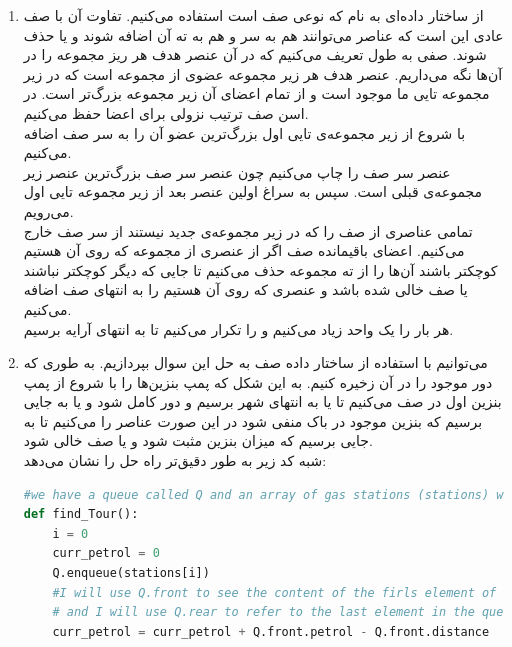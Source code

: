 \documentclass{article}
\begin{document}
\begin{enumerate}
\begin{enumerate}
\begin{latin}
\begin{flushright}
\begin{lstlisting}[language=C++]
    }
	\end{lstlisting}
	\end{flushright}								
	\end{latin}
	\end{enumerate}
	\item از ساختار داده‌ای به نام  که نوعی صف است استفاده می‌کنیم. تفاوت آن با صف عادی این است که عناصر می‌توانند هم به سر و هم به ته آن اضافه شوند و یا حذف شوند. صفی به طول  تعریف می‌کنیم که در آن عنصر هدف هر ریز مجموعه را در آن‌ها نگه می‌داریم. عنصر هدف هر زیر مجموعه عضوی از مجموعه است که در زیر مجموعه  تایی ما موجود است و از تمام اعضای آن زیر مجموعه بزرگ‌تر است. در اسن صف ترتیب نزولی برای اعضا حفظ می‌کنیم.\\
	با شروع از زیر مجموعه‌ی  تایی اول بزرگ‌ترین عضو آن را به سر صف اضافه می‌کنیم.\\
	 عنصر سر صف را چاپ می‌کنیم چون عنصر سر صف بزرگ‌ترین عنصر زیر مجموعه‌ی قبلی است. سپس به سراغ اولین عنصر بعد از زیر مجموعه  تایی اول می‌رویم. \\
	 \lr{*} تمامی عناصری از صف را که در زیر مجموعه‌ی جدید نیستند از سر صف خارج می‌کنیم. اعضای باقیمانده صف اگر از عنصری از مجموعه که روی آن هستیم کوچکتر باشند آن‌ها را از ته مجموعه حذف می‌کنیم تا جایی که دیگر کوچکتر نباشند یا صف خالی شده باشد و عنصری که روی آن هستیم را به انتهای صف اضافه می‌کنیم. \\
	 هر بار  را یک واحد زیاد می‌کنیم و  \lr{*} را تکرار می‌کنیم تا به انتهای آرایه برسیم. 
	\item می‌توانیم با استفاده از ساختار داده صف به حل این سوال بپردازیم. به طوری که دور موجود را در آن زخیره کنیم. به این شکل که پمپ بنزین‌ها را با شروع از پمپ بنزین اول در صف  می‌کنیم تا یا به انتها‌ی شهر برسیم و دور کامل شود و یا به جایی برسیم که بنزین موجود در باک منفی شود در این صورت عناصر را  می‌کنیم تا به جایی برسیم که میزان بنزین مثبت شود و یا صف خالی شود. \\
	شبه کد زیر به طور دقیق‌تر راه حل را نشان می‌دهد:\\
\begin{latin}
\begin{flushright}				
\begin{lstlisting}[language=Python]
#we have a queue called Q and an array of gas stations (stations) which have two variables: distance and petrol 
def find_Tour():
	i = 0
	curr_petrol = 0
	Q.enqueue(stations[i])
	#I will use Q.front to see the content of the firls element of the queue
	# and I will use Q.rear to refer to the last element in the queue
	curr_petrol = curr_petrol + Q.front.petrol - Q.front.distance


\end{lstlisting}
\end{flushright}
\end{latin}
\end{enumerate}
\end{document}

